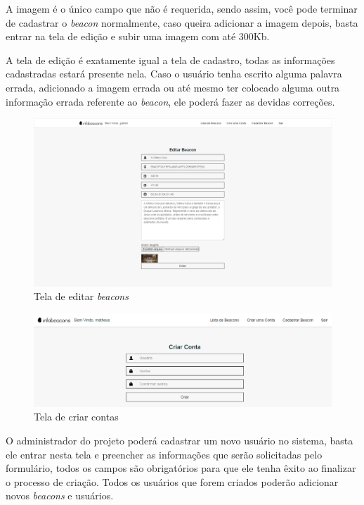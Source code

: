 A imagem é o único campo que não é requerida, sendo assim, você pode terminar de cadastrar o \textit{beacon} normalmente, caso queira adicionar a imagem depois, basta entrar na tela de edição e subir uma imagem com até 300Kb. 

A tela de edição é exatamente igual a tela de cadastro, todas as informações cadastradas estará presente nela. Caso o usuário tenha escrito alguma palavra errada, adicionado a imagem errada ou até mesmo ter colocado alguma outra informação errada referente ao \textit{beacon}, ele poderá fazer as devidas correções.

\begin{figure}[H]
  \centering  
  \includegraphics[width=16cm]{./figs/EditarBeacon.png}
  \caption{Tela de editar \textit{beacons}}
  \par{}
\end{figure}

\begin{figure}[H]
  \centering  
  \includegraphics[width=16cm]{./figs/CriarConta.jpg}
  \caption{Tela de criar contas}
  \par{}
\end{figure}

O administrador do projeto poderá cadastrar um novo usuário no sistema, basta ele entrar nesta tela e preencher as informações que serão solicitadas pelo formulário, todos os campos são obrigatórios para que ele tenha êxito ao finalizar o processo de criação. Todos os usuários que forem criados poderão adicionar novos \textit{beacons} e usuários.

